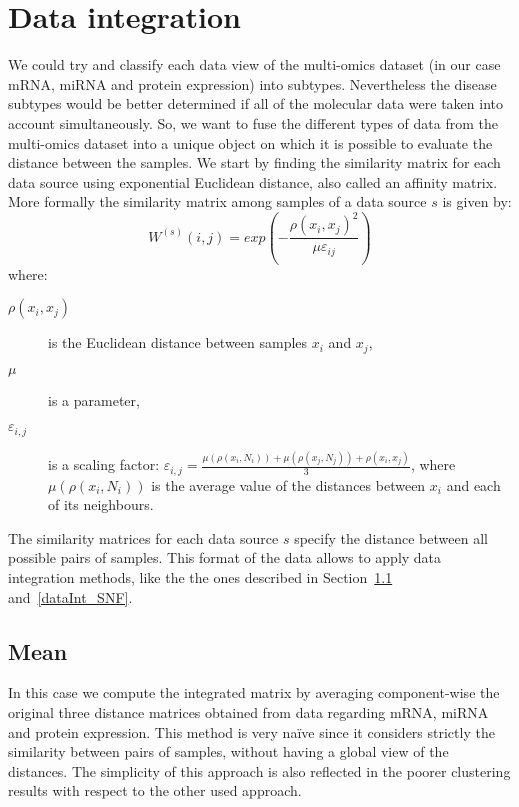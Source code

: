 \section{Data integration}\label{methods_dataInt}
We could try and classify each data view of the multi-omics dataset (in our case mRNA, miRNA and protein expression) into subtypes. Nevertheless the disease subtypes would be better determined if all of the molecular data were taken into account simultaneously. So, we want to fuse the different types of data from the multi-omics dataset into a unique object on which it is possible to evaluate the distance between the samples. We start by finding the similarity matrix for each data source using exponential Euclidean distance, also called an affinity matrix.
More formally the similarity matrix among samples of a data source $s$ is given by:
\begin{equation*}
    W^{(s)}(i,j) = exp \left(- \frac{\rho(x_i,x_j)^2}{\mu \varepsilon_{ij}}\right)
\end{equation*}
where:
\begin{description}
    \item [\boldmath$\rho(x_i, x_j)$] is the Euclidean  distance  between samples \(x_i\) and \(x_j\),
    \item [\boldmath$\mu$] is a parameter,
    \item [\boldmath$\varepsilon_{i,j}$] is a scaling factor: $\varepsilon_{i,j} = \frac{\mu(\rho(x_i, N_i)) + \mu(\rho(x_j, N_j)) + \rho(x_i, x_j)}{3}$, where  $\mu(\rho(x_i, N_i))$ is the average value of the distances between $x_i$ and each of its neighbours.
\end{description}
The similarity matrices for each data source $s$ specify the distance between all possible pairs of samples. This format of the data allows to apply data integration methods, like the the ones described in Section~\ref{dataInt_mean} and~\ref{dataInt_SNF}.

\subsection{Mean} \label{dataInt_mean}
In this case we compute the integrated matrix by averaging component-wise the original three distance matrices obtained from data regarding mRNA, miRNA and protein expression. This method is very naïve since it considers strictly the similarity between pairs of samples, without having a global view of the distances. The simplicity of this approach is also reflected in the poorer clustering results with respect to the other used approach.

